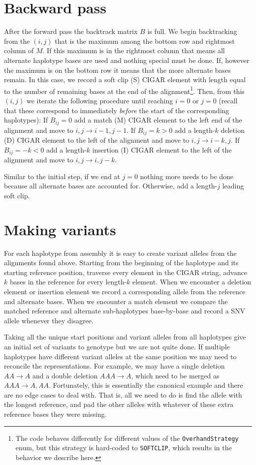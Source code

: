 \documentclass[nofootinbib,amssymb,amsmath]{revtex4}
\newcommand{\code}[1]{\texttt{#1}}
\begin{document}
\section{Backward pass}
After the forward pass the backtrack matrix $B$ is full.  We begin backtracking from the $(i,j)$ that is the maximum among the bottom row and rightmost column of $M$.  If this maximum is in the rightmost column that means all alternate haplotype bases are used and nothing special must be done.  If, however the maximum is on the bottom row it means that the more alternate bases remain.  In this case, we record a soft clip (S) CIGAR element with length equal to the number of remaining bases at the end of the alignment\footnote{The code behaves differently for different values of the \code{OverhandStrategy} enum, but this strategy is hard-coded to \code{SOFTCLIP}, which results in the behavior we describe here.}.  Then, from this $(i,j)$ we iterate the following procedure until reaching $i = 0$ or $j = 0$ (recall that these correspond to immediately \textit{before} the start of the corresponding haplotypes): If $B_{ij} = 0$ add a match (M) CIGAR element to the left end of the alignment and move to $i,j \rightarrow i - 1, j - 1$.  If $B_{ij} = k > 0$ add a length-$k$ deletion (D) CIGAR element to the left of the alignment and move to $i,j \rightarrow i - k, j$.  If $B_{ij} = -k < 0$ add a length-$k$ insertion (I) CIGAR element to the left of the alignment and move to $i,j \rightarrow i, j - k$.  

Similar to the initial step, if we end at $j = 0$ nothing more needs to be done because all alternate bases are accounted for.  Otherwise, add a length-$j$ leading soft clip.

\section{Making variants}
For each haplotype from assembly it is easy to create variant alleles from the alignments found above.  Starting from the beginning of the haplotype and its starting reference position, traverse every element in the CIGAR string, advance $k$ bases in the reference for every length-$k$ element.  When we encounter a deletion element or insertion element we record a corresponding allele from the reference and alternate bases.  When we encounter a match element we compare the matched reference and alternate sub-haplotypes base-by-base and record a SNV allele whenever they disagree.

Taking all the unique start positions and variant alleles from all haplotypes give an initial set of variants to genotype but we are not quite done.  If multiple haplotypes have different variant alleles at the same position we may need to reconcile the representations.  For example, we may have a single deletion $AA \rightarrow A$ and a double deletion $AAA \rightarrow A$, which need to be merged as $AAA \rightarrow A, AA$.  Fortunately, this is essentially the canonical example and there are no edge cases to deal with.  That is, all we need to do is find the allele with the longest reference, and pad the other alleles with whatever of these extra reference bases they were missing.
\end{document}
